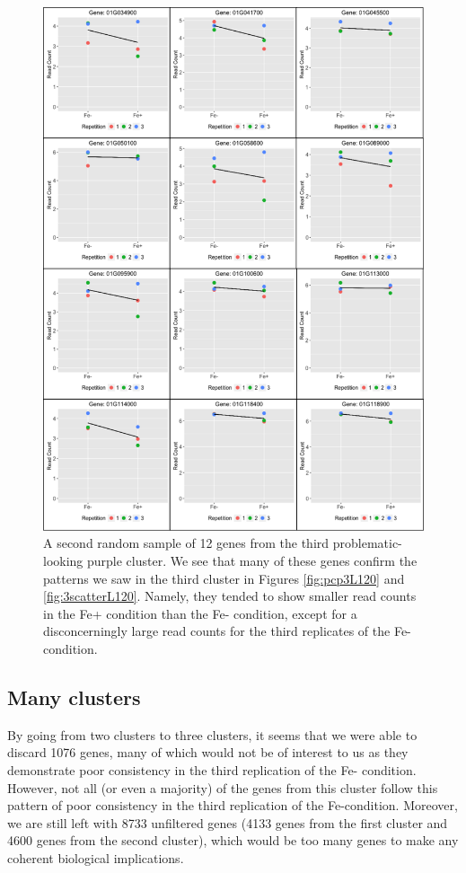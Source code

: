 \documentclass[11pt,a4paper,oldfontcommands,openany]{memoir}
\numberwithin{equation}{section} %
\begin{document}
\begin{figure}[H]
  \centering
  \includegraphics[width=\textwidth]{indSBGenes2}
  \caption{A second random sample of 12 genes from the third problematic-looking purple cluster. We see that many of these genes confirm the patterns we saw in the third cluster in Figures \ref{fig:pcp3L120} and \ref{fig:3scatterL120}. Namely, they tended to show smaller read counts in the Fe+ condition than the Fe- condition, except for a disconcerningly large read counts for the third replicates of the Fe- condition.}
  \label{fig:indSBGenes2}
\end{figure}

\subsection{Many clusters}
\label{sec:manyClusters}

By going from two clusters to three clusters, it seems that we were able to discard 1076 genes, many of which would not be of interest to us as they demonstrate poor consistency in the third replication of the Fe- condition. However, not all (or even a majority) of the genes from this cluster follow this pattern of poor consistency in the third replication of the Fe-condition. Moreover, we are still left with 8733 unfiltered genes (4133 genes from the first cluster and 4600 genes from the second cluster), which would be too many genes to make any coherent biological implications.  
\end{document}
